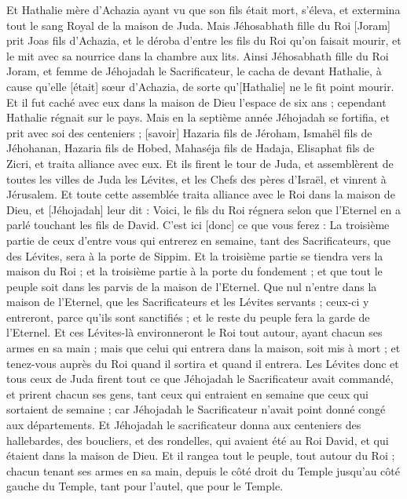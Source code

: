 \begin{multicols}{2}
Et Hathalie mère d'Achazia ayant vu que son fils était mort, s'éleva, et extermina tout le sang Royal de la maison de Juda.
Mais Jéhosabhath fille du Roi [Joram] prit Joas fils d'Achazia, et le déroba d'entre les fils du Roi qu'on faisait mourir, et le mit avec sa nourrice dans la chambre aux lits. Ainsi Jéhosabhath fille du Roi Joram, et femme de Jéhojadah le Sacrificateur, le cacha de devant Hathalie, à cause qu'elle [était] sœur d'Achazia, de sorte qu'[Hathalie] ne le fit point mourir.
Et il fut caché avec eux dans la maison de Dieu l'espace de six ans ; cependant Hathalie régnait sur le pays.
\VerseOne{}Mais en la septième année Jéhojadah se fortifia, et prit avec soi des centeniers ; [savoir] Hazaria fils de Jéroham, Ismahël fils de Jéhohanan, Hazaria fils de Hobed, Mahaséja fils de Hadaja, Elisaphat fils de Zicri, et traita alliance avec eux.
Et ils firent le tour de Juda, et assemblèrent de toutes les villes de Juda les Lévites, et les Chefs des pères d'Israël, et vinrent à Jérusalem.
Et toute cette assemblée traita alliance avec le Roi dans la maison de Dieu, et [Jéhojadah] leur dit : Voici, le fils du Roi régnera selon que l'Eternel en a parlé touchant les fils de David.
C'est ici [donc] ce que vous ferez : La troisième partie de ceux d'entre vous qui entrerez en semaine, tant des Sacrificateurs, que des Lévites, sera à la porte de Sippim.
Et la troisième partie se tiendra vers la maison du Roi ; et la troisième partie à la porte du fondement ; et que tout le peuple soit dans les parvis de la maison de l'Eternel.
Que nul n'entre dans la maison de l'Eternel, que les Sacrificateurs et les Lévites servants ; ceux-ci y entreront, parce qu'ils sont sanctifiés ; et le reste du peuple fera la garde de l'Eternel.
Et ces Lévites-là environneront le Roi tout autour, ayant chacun ses armes en sa main ; mais que celui qui entrera dans la maison, soit mis à mort ; et tenez-vous auprès du Roi quand il sortira et quand il entrera.
Les Lévites donc et tous ceux de Juda firent tout ce que Jéhojadah le Sacrificateur avait commandé, et prirent chacun ses gens, tant ceux qui entraient en semaine que ceux qui sortaient de semaine ; car Jéhojadah le Sacrificateur n'avait point donné congé aux départements.
Et Jéhojadah le sacrificateur donna aux centeniers des hallebardes, des boucliers, et des rondelles, qui avaient été au Roi David, et qui étaient dans la maison de Dieu.
Et il rangea tout le peuple, tout autour du Roi ; chacun tenant ses armes en sa main, depuis le côté droit du Temple jusqu'au côté gauche du Temple, tant pour l'autel, que pour le Temple.

\end{multicols}
